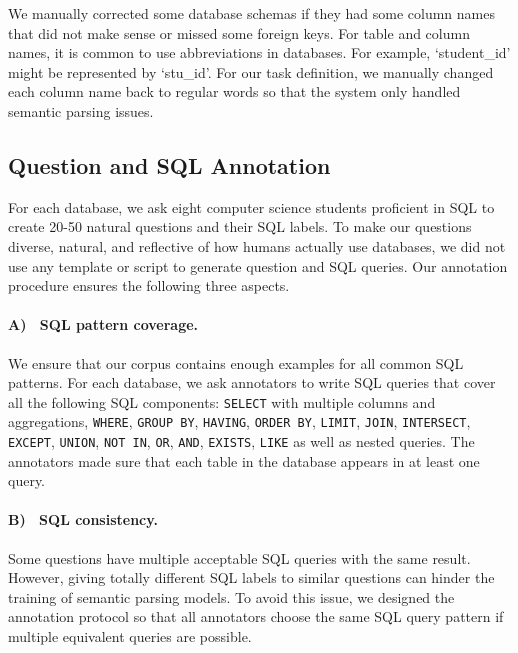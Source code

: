 \documentclass[11pt,a4paper]{article}
\begin{document}
We manually corrected some database schemas if they had some column names that did not make sense or missed some foreign keys. For table and column names, it is common to use abbreviations in databases. For example, `student\_id' might be represented by `stu\_id'. For our task definition, we manually changed each column name back to regular words so that the system only handled semantic parsing issues. 

\subsection{Question and SQL Annotation}
\label{sec:question_and_sql_annnotation}

For each database, we ask eight computer science students proficient in SQL to create 20-50 natural questions and their SQL labels. To make our questions diverse, natural, and reflective of how humans actually use databases, 
we did not use any template or script to generate question and SQL queries.
Our annotation procedure ensures the following three aspects.
 
\paragraph{A)~ SQL pattern coverage.}
We ensure that our corpus contains enough examples for all common SQL patterns. For each database, we ask annotators to write SQL queries that cover all the following SQL components: \texttt{SELECT} with multiple columns and aggregations, \texttt{WHERE}, \texttt{GROUP BY}, \texttt{HAVING}, \texttt{ORDER BY}, \texttt{LIMIT}, \texttt{JOIN}, \texttt{INTERSECT}, \texttt{EXCEPT}, \texttt{UNION}, \texttt{NOT IN}, \texttt{OR}, \texttt{AND}, \texttt{EXISTS}, \texttt{LIKE} as well as nested queries. The annotators made sure that each table in the database appears in at least one query.








\paragraph{B)~ SQL consistency.}
Some questions have multiple acceptable SQL queries with the same result.
However, giving totally different SQL labels to similar questions can hinder the training of semantic parsing models.
To avoid this issue, we designed the annotation protocol so that
all annotators choose the same SQL query pattern if multiple equivalent queries are possible. 
\end{document}
